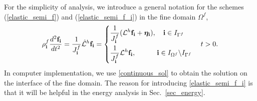 For the simplicity of analysis, we introduce a general notation for the schemes (\ref{elastic_semi_f}) and (\ref{elastic_semi_f_i}) in the fine domain $\Omega^f$,
\begin{align}\label{fine_scheme}
{\rho}^f_{\bf i}\frac{d^2{\bf f}_{\bf i}}{dt^2} =\frac{1}{J^f_{\bf i}}\hat{\mathcal{L}}^h{\bf f}_{\bf i} = \left\{
\begin{aligned}
&\frac{1}{J^f_{\bf i}}(\mathcal{L}^h{\bf f}_{\bf i} +{\bm \eta}_{\bf i}), \quad {\bf i}\in I_{\Gamma^f}\\
&\frac{1}{J^f_{\bf i}}\mathcal{L}^h{\bf f}_{\bf i},\quad\quad\quad {\bf i}\in I_{\Omega^f}\backslash I_{\Gamma^f} 
\end{aligned}
\right. \quad t > 0.
\end{align}
In computer implementation, we use \eqref{continuous_sol} to obtain the solution on the interface of the fine domain. The reason for introducing    \eqref{elastic_semi_f_i} is that it will be helpful in the energy analysis in Sec.~\ref{sec_energy}.

